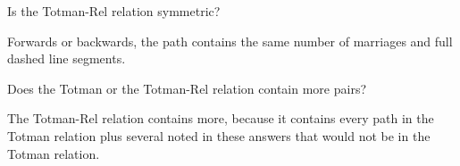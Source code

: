 \documentclass{ximera}
\begin{document}
\begin{exercise}
\begin{problem} Is the Totman-Rel relation symmetric?  
\begin{feedback}
Forwards or backwards, the path contains the same number of marriages and full dashed line segments.
\end{feedback}
\end{problem}

\begin{problem} Does the Totman or the Totman-Rel relation contain more pairs?  
\begin{feedback}
The Totman-Rel relation contains more, because it contains every path in the Totman relation plus several noted in these answers that would not be in the Totman relation.
\end{feedback}
\end{problem}





\end{exercise}
\end{document}
